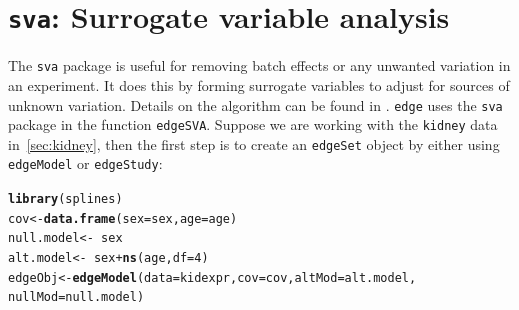 \documentclass{article}\usepackage[]{graphicx}\usepackage[]{color}
\makeatletter
\newcommand{\hlnum}[1]{\textcolor[rgb]{0.686,0.059,0.569}{#1}}%
\newcommand{\hlopt}[1]{\textcolor[rgb]{0,0,0}{#1}}%
\newcommand{\hlstd}[1]{\textcolor[rgb]{0.345,0.345,0.345}{#1}}%
\newcommand{\hlkwb}[1]{\textcolor[rgb]{0.69,0.353,0.396}{#1}}%
\newcommand{\hlkwc}[1]{\textcolor[rgb]{0.333,0.667,0.333}{#1}}%
\newcommand{\hlkwd}[1]{\textcolor[rgb]{0.737,0.353,0.396}{\textbf{#1}}}%
\newenvironment{kframe}{%
 \def\at@end@of@kframe{}%
 \ifinner\ifhmode%
  \def\at@end@of@kframe{\end{minipage}}%
  \begin{minipage}{\columnwidth}%
 \fi\fi%
 \def\FrameCommand##1{\hskip\@totalleftmargin \hskip-\fboxsep
 \colorbox{shadecolor}{##1}\hskip-\fboxsep
     \hskip-\linewidth \hskip-\@totalleftmargin \hskip\columnwidth}%
 \MakeFramed {\advance\hsize-\width
   \@totalleftmargin\z@ \linewidth\hsize
   \@setminipage}}%
 {\par\unskip\endMakeFramed%
 \at@end@of@kframe}
\newenvironment{knitrout}{}{} %
\makeatother
\begin{document}
\section{{\tt sva}: Surrogate variable analysis}
\label{sec:SVA}
The {\tt sva} package is useful for removing batch effects or any unwanted variation in an experiment. It does this by forming surrogate variables to adjust for sources of unknown variation. Details on the algorithm can be found in \cite{leek:2007}. {\tt edge} uses the {\tt sva} package in the function {\tt edgeSVA}. Suppose we are working with the {\tt kidney} data in~\ref{sec:kidney}, then the first step is to create an {\tt edgeSet} object by either using {\tt edgeModel} or {\tt edgeStudy}:
\begin{knitrout}
\color{fgcolor}\begin{kframe}
\begin{alltt}
\hlkwd{library}\hlstd{(splines)}
\hlstd{cov} \hlkwb{<-} \hlkwd{data.frame}\hlstd{(}\hlkwc{sex} \hlstd{= sex,} \hlkwc{age} \hlstd{= age)}
\hlstd{null.model} \hlkwb{<-} \hlopt{~}\hlstd{sex}
\hlstd{alt.model} \hlkwb{<-} \hlopt{~}\hlstd{sex} \hlopt{+} \hlkwd{ns}\hlstd{(age,} \hlkwc{df} \hlstd{=} \hlnum{4}\hlstd{)}
\hlstd{edgeObj} \hlkwb{<-} \hlkwd{edgeModel}\hlstd{(}\hlkwc{data} \hlstd{= kidexpr,} \hlkwc{cov} \hlstd{= cov,} \hlkwc{altMod} \hlstd{= alt.model,}
    \hlkwc{nullMod} \hlstd{= null.model)}
\end{alltt}
\end{kframe}
\end{knitrout}
\end{document}
